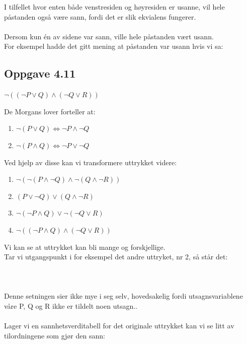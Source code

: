 \documentclass{article}
\begin{document}
I tilfellet hvor enten både venstresiden og høyresiden er usanne, vil hele påstanden også være sann, fordi det er slik ekvialens fungerer. \\ \\
Dersom kun én av sidene var sann, ville hele påstanden vært usann. \\
For eksempel hadde det gitt mening at påstanden var usann hvis vi sa: \(\)

\subsection*{Oppgave 4.11}

\(\neg((\neg P \vee Q) \wedge (\neg Q \vee R))\)

De Morgans lover forteller at:
\begin{enumerate}
    \item $\neg (P \vee Q) \Longleftrightarrow \neg P \wedge \neg Q$
    \item $\neg (P \wedge Q) \Longleftrightarrow \neg P \vee \neg Q$
\end{enumerate}

Ved hjelp av disse kan vi transformere uttrykket videre:

\begin{enumerate}
    \item $\neg ( \neg (P \wedge \neg Q) \wedge \neg (Q \wedge \neg R) )$
    \item $ (P \vee \neg Q) \vee (Q \wedge \neg R)$
    \item $\neg (\neg P \wedge Q) \vee \neg (\neg Q \vee R)$
    \item $\neg ((\neg P \wedge Q) \wedge (\neg Q \vee R))$
\end{enumerate}

Vi kan se at uttrykket kan bli mange og forskjellige.  \\
Tar vi utgangspunkt i for eksempel det andre uttryket, nr 2, så står det: \\ \\
\quad {} \\ \\

Denne setningen sier ikke mye i seg selv, hovedsakelig fordi utsagnsvariablene våre P, Q og R ikke er tildelt noen utsagn.. \\ \\
Lager vi en sannhetsverditabell for det originale uttrykket kan vi se litt av tilordningene som gjør den sann: 
\end{document}
